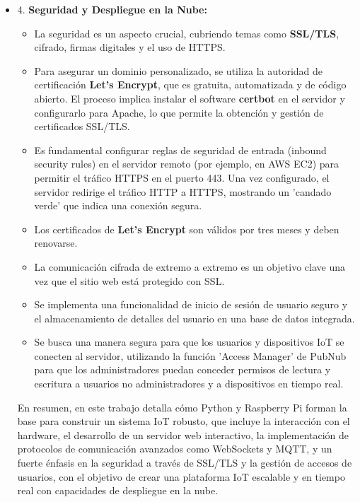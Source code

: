 \documentclass{report}
\begin{document}
\begin{itemize}
\item 4. \textbf{Seguridad y Despliegue en la Nube:}
\begin{itemize}
    \item La seguridad es un aspecto crucial, cubriendo temas como \textbf{SSL/TLS}, cifrado, firmas digitales y el uso de HTTPS.
    \item Para asegurar un dominio personalizado, se utiliza la autoridad de certificación \textbf{Let's Encrypt}, que es gratuita, 
    automatizada y de código abierto. El proceso implica instalar el software \textbf{certbot} en el servidor y configurarlo para 
    Apache, lo que permite la obtención y gestión de certificados SSL/TLS.
    \item Es fundamental configurar reglas de seguridad de entrada (inbound security rules) en el servidor remoto (por ejemplo, en 
    AWS EC2) para permitir el tráfico HTTPS en el puerto 443. Una vez configurado, el servidor redirige el tráfico HTTP a HTTPS, 
    mostrando un 'candado verde' que indica una conexión segura.
    \item Los certificados de \textbf{Let's Encrypt} son válidos por tres meses y deben renovarse.
    \item La comunicación cifrada de extremo a extremo es un objetivo clave una vez que el sitio web está protegido con SSL.
    \item Se implementa una funcionalidad de inicio de sesión de usuario seguro y el almacenamiento de detalles del usuario en una 
    base de datos integrada.
    \item Se busca una manera segura para que los usuarios y dispositivos IoT se conecten al servidor, utilizando la función 
    'Access Manager' de PubNub para que los administradores puedan conceder permisos de lectura y escritura a usuarios no 
    administradores y a dispositivos en tiempo real.
\end{itemize}

En resumen, en este trabajo detalla cómo Python y Raspberry Pi forman la base para construir un sistema IoT robusto, que incluye la 
interacción con el hardware, el desarrollo de un servidor web interactivo, la implementación de protocolos de comunicación avanzados 
como WebSockets y MQTT, y un fuerte énfasis en la seguridad a través de SSL/TLS y la gestión de accesos de usuarios, con el objetivo 
de crear una plataforma IoT escalable y en tiempo real con capacidades de despliegue en la nube.
\end{itemize}
\end{document}
